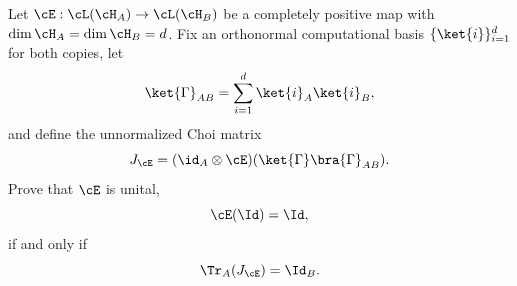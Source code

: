 Let $\cE:\cL(\cH_A)\to\cL(\cH_B)$ be a completely positive map with
$\dim\cH_A=\dim\cH_B=d$. Fix an orthonormal computational basis
$\{\ket{i}\}_{i=1}^d$ for both copies, let
$$
\ket{\Gamma}_{AB}=\sum_{i=1}^{d}\ket{i}_A\ket{i}_B,
$$
and define the unnormalized Choi matrix
$$
J_{\cE}=(\id_A\otimes\cE)(\ket{\Gamma}\bra{\Gamma}_{AB}).
$$
Prove that $\cE$ is unital,
$$
\cE(\Id)=\Id,
$$
if and only if
$$
\Tr_A(J_{\cE})=\Id_B.
$$
